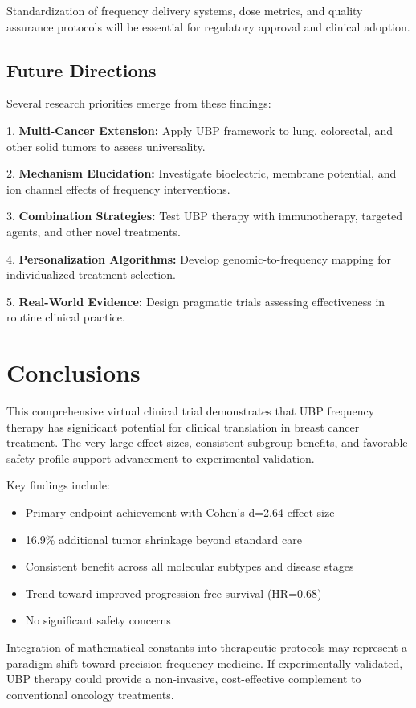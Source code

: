 \documentclass[12pt,a4paper]{article}
\begin{document}
Standardization of frequency delivery systems, dose metrics, and quality assurance protocols will be essential for regulatory approval and clinical adoption.

\subsection{Future Directions}

Several research priorities emerge from these findings:

1. \textbf{Multi-Cancer Extension:} Apply UBP framework to lung, colorectal, and other solid tumors to assess universality.

2. \textbf{Mechanism Elucidation:} Investigate bioelectric, membrane potential, and ion channel effects of frequency interventions.

3. \textbf{Combination Strategies:} Test UBP therapy with immunotherapy, targeted agents, and other novel treatments.

4. \textbf{Personalization Algorithms:} Develop genomic-to-frequency mapping for individualized treatment selection.

5. \textbf{Real-World Evidence:} Design pragmatic trials assessing effectiveness in routine clinical practice.

\section{Conclusions}

This comprehensive virtual clinical trial demonstrates that UBP frequency therapy has significant potential for clinical translation in breast cancer treatment. The very large effect sizes, consistent subgroup benefits, and favorable safety profile support advancement to experimental validation.

Key findings include:
\begin{itemize}
\item Primary endpoint achievement with Cohen's d=2.64 effect size
\item 16.9\% additional tumor shrinkage beyond standard care
\item Consistent benefit across all molecular subtypes and disease stages  
\item Trend toward improved progression-free survival (HR=0.68)
\item No significant safety concerns
\end{itemize}

Integration of mathematical constants into therapeutic protocols may represent a paradigm shift toward precision frequency medicine. If experimentally validated, UBP therapy could provide a non-invasive, cost-effective complement to conventional oncology treatments.
\end{document}
